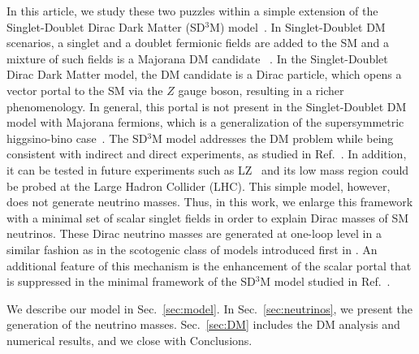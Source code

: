 \documentclass[12pt,letterpaper]{article}
\begin{document}
In this article, we study these two puzzles within a simple extension of the Singlet-Doublet Dirac Dark Matter (SD${}^3$M) model~\cite{Yaguna:2015mva}. In Singlet-Doublet DM scenarios, a singlet and a doublet fermionic fields are added to the SM and a mixture of such fields is a Majorana DM candidate ~\cite{ArkaniHamed:2005yv,Mahbubani:2005pt,DEramo:2007anh,Enberg:2007rp,Cohen:2011ec,Cheung:2013dua,Abe:2014gua,Restrepo:2015ura,Calibbi:2015nha,Horiuchi:2016tqw,Bhattacharya:2018cgx,Bhattacharya:2018fus}. 
In the Singlet-Doublet Dirac Dark Matter model, the DM candidate is a Dirac particle, which opens a vector portal to the SM via the $Z$ gauge boson, resulting in a richer phenomenology. 
In general, this portal is not present in the Singlet-Doublet DM model with Majorana fermions, which is a generalization of the supersymmetric higgsino-bino case~\cite{Restrepo:2015ura}. 
The SD${}^3$M model addresses the DM problem while being consistent with indirect and direct experiments, as studied in Ref.~\cite{Yaguna:2015mva}. 
In addition, it can be tested in future experiments such as LZ~\cite{Mount:2017qzi} and its low mass region could be probed at the Large Hadron Collider (LHC). This simple model, however, does not generate neutrino masses. Thus, in this work, we enlarge this framework with a minimal set of scalar singlet fields in order to explain Dirac masses of SM neutrinos. These Dirac neutrino masses are generated at one-loop level in a similar fashion as in the scotogenic class of models introduced first in \cite{Ma:2006km}. An additional feature of this mechanism is the enhancement of the scalar portal that is suppressed in the minimal framework of the SD$^3$M model studied in Ref.~\cite{Yaguna:2015mva}.

We describe our model in Sec.~\ref{sec:model}. In Sec.~\ref{sec:neutrinos}, we present the generation of the neutrino masses. Sec.~\ref{sec:DM} includes the DM analysis and numerical results, and we close with Conclusions.
\end{document}
